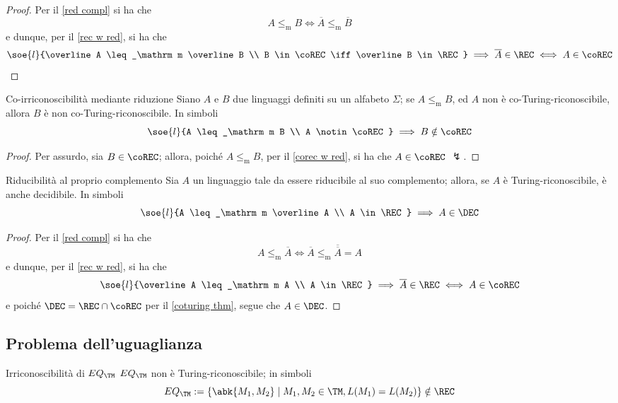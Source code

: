 \documentclass[a4paper, 12pt]{report}
\begin{document}
    \begin{proof}
        Per il \cref{red compl} si ha che $$A \leq_\mathrm m B \iff \overline{A} \leq_\mathrm m \overline B$$ e dunque, per il \cref{rec w red}, si ha che $$\soe{l}{\overline A \leq_\mathrm m \overline B \\ B \in \coREC \iff \overline B \in \REC} \implies \overline A \in \REC \iff A \in \coREC$$ 
    \end{proof}

    \begin{framedcor}[label={corec w red cor}]{Co-irriconoscibilità mediante riduzione}
        Siano $A$ e $B$ due linguaggi definiti su un alfabeto $\Sigma$; se $A \leq_\mathrm m B$, ed $A$ non è co-Turing-riconoscibile, allora $B$ è non co-Turing-riconoscibile. In simboli $$\soe{l}{A \leq_\mathrm m B \\ A \notin \coREC} \implies B \notin \coREC$$
    \end{framedcor}

    \begin{proof}
        Per assurdo, sia $B \in \coREC$; allora, poiché $A \leq_\mathrm m B$, per il \cref{corec w red}, si ha che $A \in \coREC$ $\lightning$.
    \end{proof}

    \begin{framedcor}{Riducibilità al proprio complemento}
        Sia $A$ un linguaggio tale da essere riducibile al suo complemento; allora, se $A$ è Turing-riconoscibile, è anche decidibile. In simboli $$\soe{l}{A \leq_\mathrm m \overline A \\ A \in \REC} \implies A \in \DEC$$
    \end{framedcor}

    \begin{proof}
        Per il \cref{red compl} si ha che $$A \leq_\mathrm m \overline A \iff \overline A \leq_\mathrm m \overline {\overline A} = A$$ e dunque, per il \cref{rec w red}, si ha che $$\soe{l}{\overline A \leq_\mathrm m A \\ A \in \REC} \implies \overline A \in \REC \iff A \in \coREC$$ e poiché $\DEC = \REC \cap \coREC$ per il \cref{coturing thm}, segue che $A \in \DEC$.
    \end{proof}

    \subsection{Problema dell'uguaglianza}

    \begin{framedthm}[label={eq_tm not in rec}]{Irriconoscibilità di $EQ_\TM$}
        $EQ_\TM$ non è Turing-riconoscibile; in simboli $$EQ_\TM := \{\abk{M_1, M_2} \mid M_1, M_2 \in \TM, L(M_1) = L(M_2)\} \notin \REC$$
    \end{framedthm}
\end{document}
